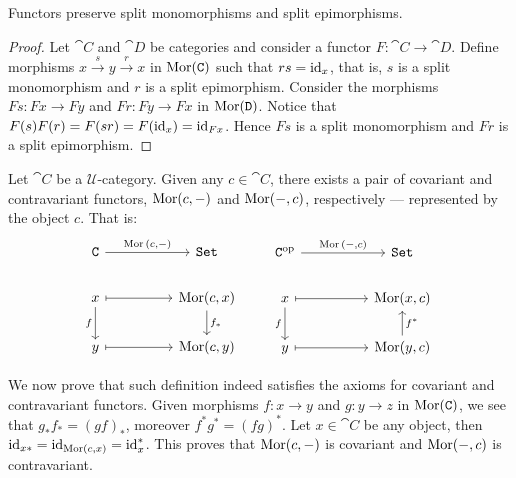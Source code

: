 \begin{lemma}\label{lem: func-preserve-split}
Functors preserve split monomorphisms and split epimorphisms.
\end{lemma}

\begin{proof}
Let \(\cat C\) and \(\cat D\) be categories and consider a functor \(F: \cat C
\to \cat D\). Define morphisms \(x \xrightarrow s y \xrightarrow r x\) in
\(\operatorname{Mor}(\texttt C)\) such that \(r s = \operatorname{id}_x\), that is, \(s\) is a split
monomorphism and \(r\) is a split epimorphism. Consider the morphisms \(F s: F
x \to F y\) and \(F r: F y \to F x\) in \(\operatorname{Mor}(\texttt D)\). Notice that \(F (s)
F(r) = F(s r) = F(\operatorname{id}_x) = \operatorname{id}_{F x}\). Hence \(F s\) is a split monomorphism
and \(F r\) is a split epimorphism.
\end{proof}

\begin{definition}\label{def:hom-functors}
Let \(\cat C\) be a \(\mathcal U\)-category. Given any \(c \in \cat C\), there
exists a pair of covariant and contravariant functors, \(\operatorname{Mor}(c, -)\) and
\(\operatorname{Mor}(-, c)\), respectively --- represented by the object \(c\). That is:
\[
  \begin{tikzcd}
    \cat C \ar[rr, "\Hom{(c, -)}"] & & \Set
    \\
    x \ar[rr, maps to] \ar[d, swap, "f"]
    & & \Hom(c, x) \ar[d, "f_*"]
    \\
    y \ar[rr, maps to] & & \Hom(c, y)
  \end{tikzcd}
  \qquad
  \begin{tikzcd}
    \cat C^\op \ar[rr, "\Hom{(-, c)}"] & & \Set
    \\
    x \ar[rr, maps to] \ar[d, swap, "f"]
    & & \Hom(x, c)
    \\
    y \ar[rr, maps to] & & \Hom(y, c) \ar[u, swap, "f^*"]
  \end{tikzcd}
\]
\end{definition}

We now prove that such definition indeed satisfies the axioms for covariant and
contravariant functors. Given morphisms \(f: x \to y\) and \(g: y \to z\) in
\(\operatorname{Mor}(\texttt C)\), we see that \(g_* f_* = (g f)_*\), moreover \(f^* g^* = (f
g)^*\). Let \(x \in \cat C\) be any object, then \(\operatorname{id}_{x *} = \operatorname{id}_{\operatorname{Mor}(c, x)}
= \operatorname{id}_x^*\). This proves that \(\operatorname{Mor}(c, -)\) is covariant and \(\operatorname{Mor}(-, c)\) is
contravariant.

